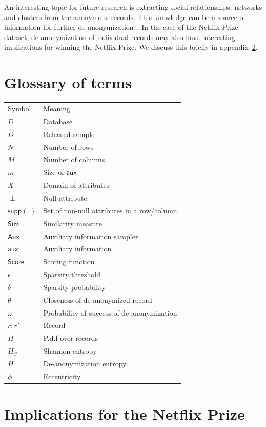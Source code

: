 \documentclass[11pt]{article}
\newcommand{\Sim}{\textsf{Sim}}
\newcommand{\Aux}{\textsf{Aux}}
\newcommand{\aux}{\textsf{aux}}
\newcommand{\supp}{\textsf{supp}}
\newcommand{\score}{\textsf{Score}}
\begin{document}
An interesting topic for future research is extracting
social relationships, networks and clusters from the anonymous
records.  This knowledge can be a source of information for further
de-anonymization~\cite{hayes}.  In the case of the Netflix Prize dataset,
de-anonymization of individual records may also have interesting
implications for winning the Netflix Prize.  We discuss this briefly
in appendix~\ref{winprize}.






\begin{appendix}
\section{Glossary of terms}

\begin{tabular}{|l|l|}
\hline
Symbol&Meaning \\
$D$&Database\\
${\hat D}$&Released sample\\
$N$&Number of rows\\
$M$&Number of columns\\
$m$&Size of $\aux$\\
$X$&Domain of attributes\\
$\perp$&Null attribute\\
$\supp(.)$&Set of non-null attributes in a row/column\\
$\Sim$&Similarity measure\\
$\Aux$&Auxiliary information sampler\\
$\aux$&Auxiliary information\\
$\score$&Scoring function\\
$\epsilon$&Sparsity threshold\\
$\delta$&Sparsity probability\\
$\theta$&Closeness of de-anonymized record\\
$\omega$&Probability of success of de-anonymization\\
$r, r'$&Record\\
$\Pi$&P.d.f over records\\
$H_S$&Shannon entropy\\
$H$&De-anonymization entropy\\
$\phi$&Eccentricity\\
\hline
\end{tabular}


\section{Implications for the Netflix Prize}
\label{winprize}


\end{appendix}
\end{document}
